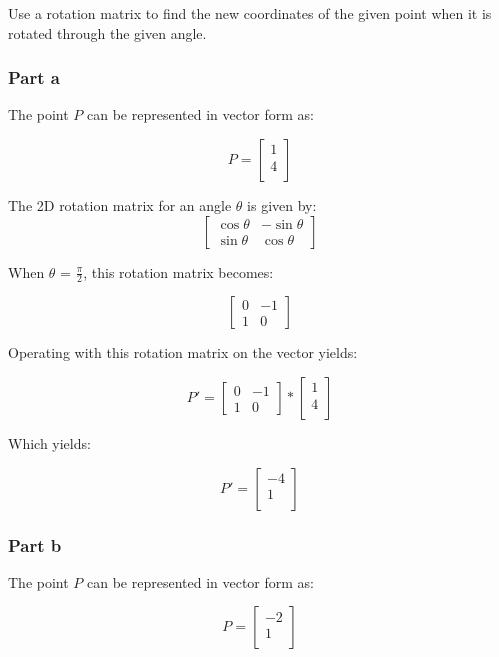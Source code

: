 \documentclass{article}
\begin{document}
Use a rotation matrix to find the new coordinates of the given point when it is rotated through the given angle.

\subsubsection*{Part a}

The point $P$ can be represented in vector form as: 

\[
  P= 
  \left[ {\begin{array}{c}
    1 \\
    4 \\
  \end{array} } \right]
\]

The 2D rotation matrix for an angle $\theta$ is given by:
\[
\begin{bmatrix}
\cos \theta & -\sin \theta \\
\sin \theta & \cos \theta
\end{bmatrix}
\]

When $\theta$ = $\frac{\pi}{2}$, this rotation matrix becomes:

\[
\begin{bmatrix}
0 & -1 \\
1 & 0
\end{bmatrix}
\]

Operating with this rotation matrix on the vector yields:


\[P ' =
\begin{bmatrix}
0 & -1 \\
1 & 0
\end{bmatrix}
*   \left[ {\begin{array}{c}
    1 \\
    4 \\
  \end{array} } \right]
\]

Which yields:

\[
  P'= 
  \left[ {\begin{array}{c}
    -4 \\
    1 \\
  \end{array} } \right]
\]


\subsubsection*{Part b}

The point $P$ can be represented in vector form as: 

\[
  P= 
  \left[ {\begin{array}{c}
    -2 \\
    1 \\
  \end{array} } \right]
\]
\end{document}
